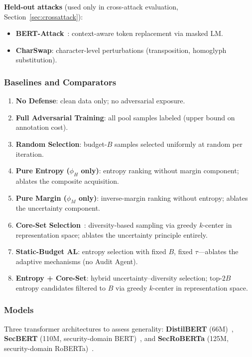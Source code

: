 \documentclass[review,1p,times,number]{elsarticle}
\begin{document}
\textbf{Held-out attacks} (used only in cross-attack evaluation,
Section~\ref{sec:crossattack}):
\begin{itemize}[leftmargin=1.5em,itemsep=1pt]
  \item \textbf{BERT-Attack}~\cite{li2020bertattack}:
    context-aware token replacement via masked LM.
  \item \textbf{CharSwap}: character-level perturbations
    (transposition, homoglyph substitution).
\end{itemize}

\subsubsection{Baselines and Comparators}

\begin{enumerate}[leftmargin=2em,label=(\arabic*),itemsep=1pt]
  \item \textbf{No Defense}: clean data only; no adversarial exposure.
  \item \textbf{Full Adversarial Training}: all pool samples
    labeled (upper bound on annotation cost).
  \item \textbf{Random Selection}: budget-$B$ samples selected
    uniformly at random per iteration.
  \item \textbf{Pure Entropy ($\phi_H$ only)}: entropy ranking without
    margin component; ablates the composite acquisition.
  \item \textbf{Pure Margin ($\phi_M$ only)}: inverse-margin ranking
    without entropy; ablates the uncertainty component.
  \item \textbf{Core-Set Selection}~\cite{sener2018active}:
    diversity-based sampling via greedy $k$-center in representation
    space; ablates the uncertainty principle entirely.
  \item \textbf{Static-Budget AL}: entropy selection with fixed $B$,
    fixed $\tau$---ablates the adaptive mechanisms (no Audit Agent).
  \item \textbf{Entropy + Core-Set}: hybrid uncertainty--diversity
    selection; top-$2B$ entropy candidates filtered to $B$ via greedy
    $k$-center in representation space.
\end{enumerate}

\subsubsection{Models}

Three transformer architectures to assess generality:
\textbf{DistilBERT} (66M)~\cite{sanh2019distilbert},
\textbf{SecBERT} (110M, security-domain BERT)~\cite{secbert2022}, and
\textbf{SecRoBERTa} (125M, security-domain RoBERTa)~\cite{secroberta2022}.
\end{document}
